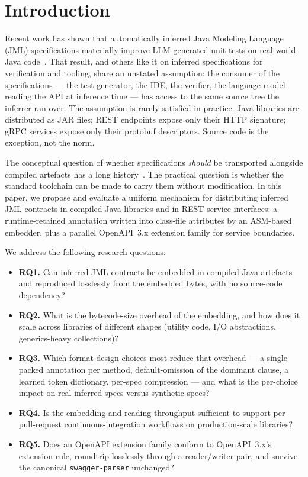 \section{Introduction}
\label{sec:introduction}

Recent work has shown that automatically inferred Java Modeling Language (JML) specifications materially improve LLM-generated unit tests on real-world Java code~\cite{edmonds2026inference}. That result, and others like it on inferred specifications for verification and tooling, share an unstated assumption: the consumer of the specifications --- the test generator, the IDE, the verifier, the language model reading the API at inference time --- has access to the same source tree the inferrer ran over. The assumption is rarely satisfied in practice. Java libraries are distributed as JAR files; REST endpoints expose only their HTTP signature; gRPC services expose only their protobuf descriptors. Source code is the exception, not the norm.

The conceptual question of whether specifications \emph{should} be transported alongside compiled artefacts has a long history~\cite{meyer1992design,leavens2006design,jml}. The practical question is whether the standard toolchain can be made to carry them without modification. In this paper, we propose and evaluate a uniform mechanism for distributing inferred JML contracts in compiled Java libraries and in REST service interfaces: a runtime-retained annotation written into class-file attributes by an ASM-based embedder, plus a parallel OpenAPI~3.x extension family for service boundaries.

We address the following research questions:

\begin{itemize}\setlength\itemsep{0.2em}
  \item \textbf{RQ1.} Can inferred JML contracts be embedded in compiled Java artefacts and reproduced losslessly from the embedded bytes, with no source-code dependency?
  \item \textbf{RQ2.} What is the bytecode-size overhead of the embedding, and how does it scale across libraries of different shapes (utility code, I/O abstractions, generics-heavy collections)?
  \item \textbf{RQ3.} Which format-design choices most reduce that overhead --- a single packed annotation per method, default-omission of the dominant clause, a learned token dictionary, per-spec compression --- and what is the per-choice impact on real inferred specs versus synthetic specs?
  \item \textbf{RQ4.} Is the embedding and reading throughput sufficient to support per-pull-request continuous-integration workflows on production-scale libraries?
  \item \textbf{RQ5.} Does an OpenAPI extension family conform to OpenAPI~3.x's extension rule, roundtrip losslessly through a reader/writer pair, and survive the canonical \texttt{swagger-parser} unchanged?
\end{itemize}

